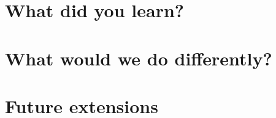 \section{What did you learn?}

\section{What would we do differently?}

\section{Future extensions}
